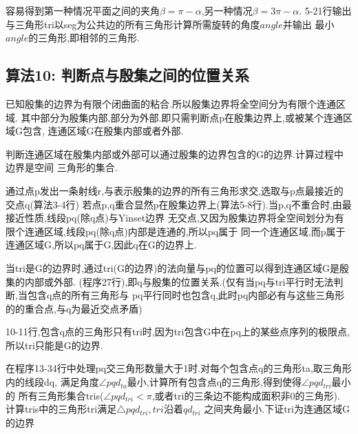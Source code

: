 \documentclass[a4paper]{book}
\numberwithin{equation}{chapter}
\theoremstyle{definition}
\begin{document}
容易得到第一种情况平面之间的夹角$\beta = \pi - \alpha$,另一种情况$\beta = 3 \pi - \alpha$.
5-21行输出与三角形tri以seg为公共边的所有三角形计算所需旋转的角度$angle$并输出
最小$angle$的三角形,即相邻的三角形.

\subsection{算法10: 判断点与殷集之间的位置关系}

已知殷集的边界为有限个闭曲面的粘合.所以殷集边界将全空间分为有限个连通区域.
其中部分为殷集内部,部分为外部.即只需判断点p在殷集边界上,或被某个连通区域G包含,
连通区域G在殷集内部或者外部.

判断连通区域在殷集内部或外部可以通过殷集的边界包含的G的边界.计算过程中边界是空间
三角形的集合.

通过点p发出一条射线r,与表示殷集的边界的所有三角形求交,选取与p点最接近的交点q(算法3-4行)
若点p,q重合显然p在殷集边界上(算法5-8行).当p,q不重合时,由最接近性质,线段pq(除q点)与Yinset边界
无交点,又因为殷集边界将全空间划分为有限个连通区域,线段pq(除q点)内部是连通的,所以pq属于
同一个连通区域,而p属于连通区域G,所以pq属于G,因此q在G的边界上.

当tri是G的边界时,通过tri(G的边界)的法向量与pq的位置可以得到连通区域G是殷集的内部或外部.
(程序27行),即q与殷集的位置关系.(仅有当pq与tri平行时无法判断,当包含q点的所有三角形与
pq平行同时也包含q,此时pq内部必有与这些三角形的的重合点,与q为最近交点矛盾)

10-11行,包含q点的三角形只有tri时,因为tri包含G中在pq上的某些点序列的极限点,
所以tri只能是G的边界.

在程序13-34行中处理pq交三角形数量大于1时.对每个包含点q的三角形ta,取三角形内的线段dq,
满足角度$\angle pqd_{ta}$最小,计算所有包含点q的三角形,得到使得$\angle pqd_{tri}$最小的
所有三角形集合tris($\angle pqd_{tri} < \pi$,或者tri的三条边不能构成面积非0的三角形).
计算tris中的三角形tri满足$\triangle pqd_{tri},tri$沿着$qd_{tri}$
之间夹角最小.下证tri为连通区域G的边界
\end{document}
